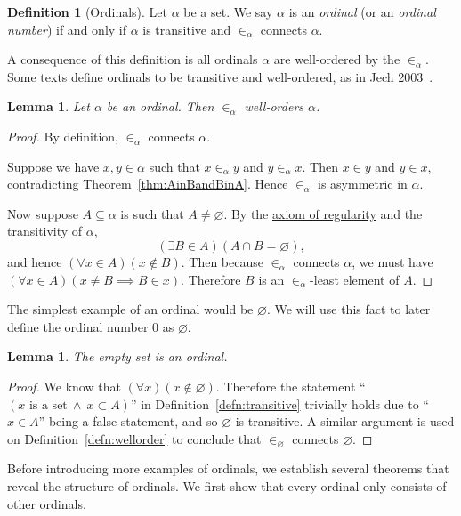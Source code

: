 \documentclass[a4paper,11pt]{article}
\theoremstyle{plain}
\newtheorem{lem}[thm]{Lemma}
\theoremstyle{definition}
\newtheorem{defn}[thm]{Definition}
\theoremstyle{remark}
\begin{document}
\begin{defn}[Ordinals]
Let $\alpha$ be a set. We say $\alpha$ is an \textit{ordinal} (or an \textit{ordinal number}) if and only if $\alpha$ is transitive and $\in_\alpha$ connects $\alpha$.
\end{defn}

A consequence of this definition is all ordinals $\alpha$ are well-ordered by the $\in_\alpha$. Some texts define ordinals to be transitive and well-ordered, as in Jech 2003~\citep[p. 19]{JechBook}.
\begin{lem}
Let $\alpha$ be an ordinal. Then $\in_\alpha$ well-orders $\alpha$.
\end{lem}
\begin{proof}
By definition, $\in_\alpha$ connects $\alpha$.

Suppose we have $x,y\in\alpha$ such that $x\in_\alpha y$ and $y\in_\alpha x$. Then $x\in y$ and $y \in x$, contradicting Theorem~\ref{thm:AinBandBinA}. Hence $\in_\alpha$ is asymmetric in $\alpha$.

Now suppose $A \subseteq  \alpha$ is such that $A\neq\varnothing$. By the \hyperref[axiom:regularity]{axiom of regularity} and the transitivity of $\alpha$,
\[(\exists B\in A)(A \cap B = \varnothing),\]
and hence $(\forall x\in A)(x\notin B)$. Then because $\in_\alpha$ connects $\alpha$, we must have $(\forall x\in A)(x\neq B \implies B\in x)$. Therefore $B$ is an $\in_\alpha$-least element of $A$.
\end{proof}

The simplest example of an ordinal would be $\varnothing$. We will use this fact to later define the ordinal number $0$ as $\varnothing$.
\begin{lem}
\label{lem:emptyordinal}
The empty set is an ordinal.
\end{lem}
\begin{proof}
We know that $(\forall x)(x\notin \varnothing)$. Therefore the statement ``$(x \text{ is a set}\ \land \ x\subset A)$'' in Definition~\ref{defn:transitive} trivially holds due to ``$x\in A$'' being a false statement, and so $\varnothing$ is transitive. A similar argument is used on Definition~\ref{defn:wellorder} to conclude that $\in_\varnothing$ connects $\varnothing$.
\end{proof}

Before introducing more examples of ordinals, we establish several theorems that reveal the structure of ordinals. We first show that every ordinal only consists of other ordinals.
\end{document}

